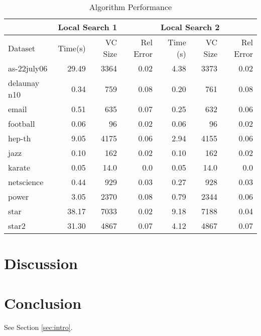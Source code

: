 \documentclass[sigconf]{acmart}
\begin{document}
\begin{table}[h]
	\centering
	\caption{Algorithm Performance}
	\label{algperf}
	\begin{tabular}{lrrrrrr}
		\hline
		& \multicolumn{3}{l}{Local Search 1} & \multicolumn{3}{l}{Local Search 2} \\ \hline
		Dataset & Time(s)    & VC Size   & Rel Error  & Time (s)   & VC Size   & Rel Error  \\ \hline
		as-22july06    & 29.49   & 3364      & 0.02   & 4.38   & 3373      & 0.02   \\
		delaunay n10    & 0.34   & 759      & 0.08   & 0.20   & 761      & 0.08   \\
		email    & 0.51   & 635      & 0.07   & 0.25   & 632      & 0.06   \\
		football    & 0.06   & 96      & 0.02   & 0.06   & 96      & 0.02   \\
		hep-th    & 9.05   & 4175      & 0.06   & 2.94   & 4155      & 0.06   \\
		jazz    & 0.10   & 162      & 0.02   & 0.10   & 162      & 0.02   \\
		karate    & 0.05   & 14.0      & 0.0   & 0.05   & 14.0      & 0.0   \\
		netscience    & 0.44   & 929      & 0.03   & 0.27   & 928      & 0.03   \\
		power    & 3.05   & 2370      & 0.08   & 0.79   & 2344      & 0.06   \\
		star    & 38.17   & 7033      & 0.02   & 9.18   & 7188      & 0.04   \\
		star2    & 31.30   & 4867      & 0.07   & 4.12   & 4867      & 0.07   \\
	\end{tabular}
\end{table}

\section{Discussion}

\section{Conclusion}
See Section \ref{sec:intro}.


 
\end{document}
